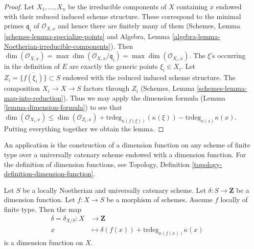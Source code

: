 \begin{proof}
Let $X_1, \ldots, X_n$ be the irreducible components of $X$ containing $x$
endowed with their reduced induced scheme structure.
These correspond to the minimal primes $\mathfrak q_i$ of
$\mathcal{O}_{X, x}$ and hence there are finitely many of them
(Schemes, Lemma \ref{schemes-lemma-specialize-points} and
Algebra, Lemma \ref{algebra-lemma-Noetherian-irreducible-components}).
Then
$\dim(\mathcal{O}_{X, x}) = \max \dim(\mathcal{O}_{X, x}/\mathfrak q_i)
= \max \dim(\mathcal{O}_{X_i, x})$.
The $\xi$'s occurring in the definition of $E$ are exactly the
generic points $\xi_i \in X_i$. Let $Z_i = \overline{\{f(\xi_i)\}} \subset S$
endowed with the reduced induced scheme structure.
The composition $X_i \to X \to S$ factors through $Z_i$
(Schemes, Lemma \ref{schemes-lemma-map-into-reduction}). Thus we may apply
the dimension formula (Lemma \ref{lemma-dimension-formula})
to see that
$\dim(\mathcal{O}_{X_i, x}) \leq \dim(\mathcal{O}_{Z_i, x}) +
\text{trdeg}_{\kappa(f(\xi))}(\kappa(\xi)) -
\text{trdeg}_{\kappa(s)} \kappa(x)$. Putting everything together
we obtain the lemma.
\end{proof}

\noindent
An application is the construction of a dimension function
on any scheme of finite type over a universally catenary
scheme endowed with a dimension function. For the definition
of dimension functions, see
Topology, Definition \ref{topology-definition-dimension-function}.

\begin{lemma}
\label{lemma-dimension-function-propagates}
Let $S$ be a locally Noetherian and universally catenary scheme.
Let $\delta : S \to \mathbf{Z}$ be a dimension function.
Let $f : X \to S$ be a morphism of schemes.
Assume $f$ locally of finite type.
Then the map
\begin{align*}
\delta = \delta_{X/S} : X & \longrightarrow \mathbf{Z} \\
x & \longmapsto \delta(f(x)) + \text{trdeg}_{\kappa(f(x))} \kappa(x)
\end{align*}
is a dimension function on $X$.
\end{lemma}

